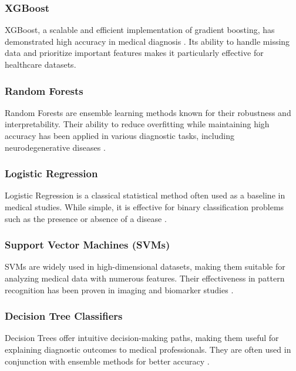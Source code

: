 \documentclass[conference]{IEEEtran}
\begin{document}
\subsubsection{XGBoost}
XGBoost, a scalable and efficient implementation of gradient boosting, has demonstrated high accuracy in medical diagnosis \cite{b1}. Its ability to handle missing data and prioritize important features makes it particularly effective for healthcare datasets.

\subsubsection{Random Forests}
Random Forests are ensemble learning methods known for their robustness and interpretability. Their ability to reduce overfitting while maintaining high accuracy has been applied in various diagnostic tasks, including neurodegenerative diseases \cite{b2}.

\subsubsection{Logistic Regression}
Logistic Regression is a classical statistical method often used as a baseline in medical studies. While simple, it is effective for binary classification problems such as the presence or absence of a disease \cite{b7}.

\subsubsection{Support Vector Machines (SVMs)}
SVMs are widely used in high-dimensional datasets, making them suitable for analyzing medical data with numerous features. Their effectiveness in pattern recognition has been proven in imaging and biomarker studies \cite{b3}.

\subsubsection{Decision Tree Classifiers}
Decision Trees offer intuitive decision-making paths, making them useful for explaining diagnostic outcomes to medical professionals. They are often used in conjunction with ensemble methods for better accuracy \cite{b7}.
\end{document}
